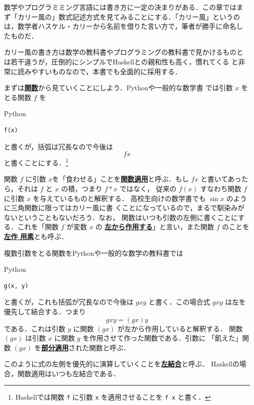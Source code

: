 \documentclass[a5paper,twoside,fleqn]{jsbook}
\newcommand{\programminglanguage}[1]{\textsf{#1}}
\newcommand{\haskell}{\programminglanguage{Haskell}}
\newcommand{\python}{\programminglanguage{Python}}
\newcommand{\keyword}[1]{{\underline{\textbf{#1}}}}
\newcommand{\code}[1]{\texttt{#1}}
\newenvironment{pythoncode}{\begin{itembox}[r]{\python}}{\end{itembox}}
\begin{document}
数学やプログラミミング言語には書き方に一定の決まりがある．この章ではま
ず「カリー風の」数式記述方式を見てみることにする．「カリー風」というの
は，数学者ハスケル・カリーから名前を借りた言い方で，筆者が勝手に命名し
たものだ．

カリー風の書き方は数学の教科書やプログラミングの教科書で見かけるものと
は若干違うが，圧倒的にシンプルで\haskell との親和性も高く，慣れてくる
と非常に読みやすいものなので，本書でも全面的に採用する．

まずは\keyword{関数}から見ていくことにしよう．\python や一般的な数学書
では引数 $x$ をとる関数 $f$ を
\begin{pythoncode}
\begin{verbatim}
f(x)
\end{verbatim}
\end{pythoncode}
と書くが，括弧は冗長なので今後は
\begin{equation}
fx
\end{equation}
と書くことにする．\footnote{\haskell では関数 \code{f} に引数 \code{x}
  を適用させることを \code{f x} と書く．}


関数 $f$ に引数 $x$を「食わせる」ことを\keyword{関数適用}と呼ぶ．もし
$fx$ と書いてあったら，それは $f$ と $x$ の積，つまり $f*x$ ではなく，
従来の $f(x)$ すなわち関数 $f$ に引数 $x$ を与えているものと解釈する．
高校生向けの数学書でも $\sin x$ のように三角関数に限ってはカリー風に書
くことになっているので，まるで馴染みがないということもないだろう．なお，
関数はいつも引数の左側に書くことにする．これを「関数 $f$ が変数 $x$ の
  \keyword{左から作用する}」と言い，また関数 $f$ のことを\keyword{左作
  用素}とも呼ぶ．

複数引数をとる関数を\python や一般的な数学の教科書では
\begin{pythoncode}
\begin{verbatim}
g(x, y)
\end{verbatim}
\end{pythoncode}
と書くが，これも括弧が冗長なので今後は $gxy$ と書く．この場合式 $gxy$
は左を優先して結合する．つまり
\begin{equation}
gxy=(gx)y
\end{equation}
である．これは引数 $y$ に関数 $(gx)$ が左から作用していると解釈する．
関数 $(gx)$ は引数 $x$ に関数 $g$ を作用させて作った関数である．引数に
「飢えた」関数 $(gx)$ を\keyword{部分適用}された関数と呼ぶ．

このように式の左側を優先的に演算していくことを\keyword{左結合}と呼ぶ．
\haskell の場合，関数適用はいつも左結合である．
\end{document}
